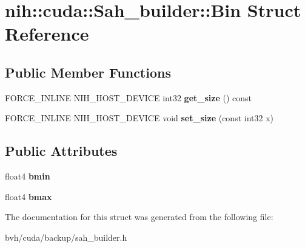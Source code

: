 \hypertarget{structnih_1_1cuda_1_1_sah__builder_1_1_bin}{
\section{nih\-:\-:cuda\-:\-:\-Sah\-\_\-builder\-:\-:\-Bin \-Struct \-Reference}
\label{structnih_1_1cuda_1_1_sah__builder_1_1_bin}
}
\subsection*{\-Public \-Member \-Functions}
\begin{DoxyCompactItemize}
\item 
\hypertarget{structnih_1_1cuda_1_1_sah__builder_1_1_bin_a07e4e088ff4f4fd6a36754a503c8a189}{
\-F\-O\-R\-C\-E\-\_\-\-I\-N\-L\-I\-N\-E \-N\-I\-H\-\_\-\-H\-O\-S\-T\-\_\-\-D\-E\-V\-I\-C\-E int32 {\bfseries get\-\_\-size} () const }
\label{structnih_1_1cuda_1_1_sah__builder_1_1_bin_a07e4e088ff4f4fd6a36754a503c8a189}

\item 
\hypertarget{structnih_1_1cuda_1_1_sah__builder_1_1_bin_a8e1d01524a40f8215001e619a54153bb}{
\-F\-O\-R\-C\-E\-\_\-\-I\-N\-L\-I\-N\-E \-N\-I\-H\-\_\-\-H\-O\-S\-T\-\_\-\-D\-E\-V\-I\-C\-E void {\bfseries set\-\_\-size} (const int32 x)}
\label{structnih_1_1cuda_1_1_sah__builder_1_1_bin_a8e1d01524a40f8215001e619a54153bb}

\end{DoxyCompactItemize}
\subsection*{\-Public \-Attributes}
\begin{DoxyCompactItemize}
\item 
\hypertarget{structnih_1_1cuda_1_1_sah__builder_1_1_bin_a50945de37389ef840eb7bbefb57b0d40}{
float4 {\bfseries bmin}}
\label{structnih_1_1cuda_1_1_sah__builder_1_1_bin_a50945de37389ef840eb7bbefb57b0d40}

\item 
\hypertarget{structnih_1_1cuda_1_1_sah__builder_1_1_bin_a47205ffafe0ef53051ede1d452e6a7d9}{
float4 {\bfseries bmax}}
\label{structnih_1_1cuda_1_1_sah__builder_1_1_bin_a47205ffafe0ef53051ede1d452e6a7d9}

\end{DoxyCompactItemize}


\-The documentation for this struct was generated from the following file\-:\begin{DoxyCompactItemize}
\item 
bvh/cuda/backup/sah\-\_\-builder.\-h\end{DoxyCompactItemize}
